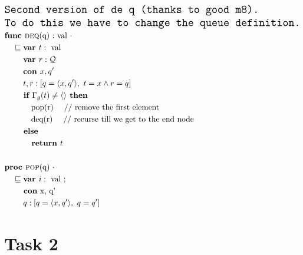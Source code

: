 \documentclass[a4paper]{scrartcl}
\newcommand{\refinedby}{\sqsubseteq} %
\begin{document}
\begin{align*}
& \texttt{\Large{Second version of de	q (thanks to good m8).}} \\
& \texttt{\Large{To do this we have to change the queue definition.}} \\
& \textbf{func }\text{\textsc{deq}(q) :} \text{ val } \cdot \\
    & \quad \refinedby \textbf{var }t : \text{ val} \\
    & \quad \quad ~ \textbf{var } r : \mathcal{Q}  \\
    & \quad \quad ~ \textbf{con }x, q'  \\
    & \quad \quad ~t, r : [q = \langle x, q' \rangle, ~ t = x \land r = q]\\
    & \quad \quad \textbf{ if } \Gamma_g(t) \neq \langle \rangle \textbf{ then} \\
    & \quad \quad \quad \text{ pop(r)    \quad // remove the first element} \\
    & \quad \quad \quad \text{ deq(r)    \quad  // recurse till we get to the end node} \\
    & \quad \quad \textbf{ else} \\
    & \quad \quad \quad \textbf{ return } t \\\\
& \textbf{proc }\text{\textsc{pop}(q) } \cdot \\
	& \quad \refinedby \textbf{var }i : \text{ val ; } \\
	& \quad \quad \textbf{ con}\text{ x, q'} \\
	& \quad \quad~ q : [q = \langle x, q' \rangle, ~ q = q'] \\
\end{align*}

\section*{Task 2}
\end{document}

